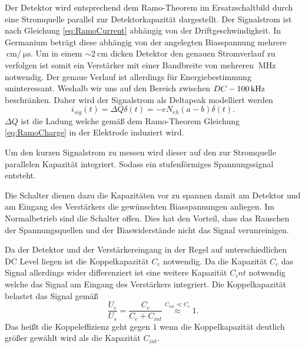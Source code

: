 Der Detektor wird entsprechend dem Ramo-Theorem im Ersatzschaltbild durch eine Stromquelle parallel zur Detektorkapazität dargestellt.
Der Signalstrom ist nach Gleichung \eqref{eq:RamoCurrent} abhängig von der Driftgeschwindigkeit.
In Germanium beträgt diese abhängig von der angelegten Biasspannung mehrere $\SI{}{\centi\meter}/\SI{}{\micro\second}$\cite{Jacoboni1981}.
Um in einem $\sim\SI{2}{\centi\meter}$ dicken Detektor den genauen Stromverlauf zu verfolgen ist somit ein Verstärker mit einer Bandbreite von mehreren $\SI{}{\mega\hertz}$ notwendig.
Der genaue Verlauf ist allerdings für Energiebestimmung uninteressant.
Weshalb wir uns auf den Bereich zwischen $DC\--\SI{100}{\kilo\hertz}$ beschränken.
Daher wird der Signalstrom als Deltapeak modelliert werden
\begin{equation}
i_{sig}(t) = \Delta Q \delta(t) = -eN_{eh}(a-b)\delta(t).
\end{equation}
$\Delta Q$ ist die Ladung welche gemäß dem Ramo-Theorem Gleichung \eqref{eq:RamoCharge} in der Elektrode induziert wird.

Um den kurzen Signalstrom zu messen wird dieser auf den zur Stromquelle parallelen Kapazität integriert.
Sodass ein stufenförmiges Spannungssignal entsteht.

Die Schalter dienen dazu die Kapazitäten vor zu spannen damit am Detektor und am Eingang des Verstärkers die gewünschten Biasspannungen anliegen.
Im Normalbetrieb sind die Schalter offen.
Dies hat den Vorteil, dass das Rauschen der Spannungsquellen und der Biaswiderstände nicht das Signal verunreinigen.

Da der Detektor und der Verstärkereingang in der Regel auf unterschiedlichen DC Level liegen ist die Koppelkapazität $C_c$ notwendig.
Da die Kapazität $C_c$ das Signal allerdings wider differenziert ist eine weitere Kapazität $C_int$ notwendig welche das Signal am Eingang des Verstärkers integriert.
Die Koppelkapazität belastet das Signal gemäß
\begin{equation}
\frac{U_e}{U_s} = \frac{C_c}{C_c + C_{int}} \stackrel{C_{int} \ll C_c}{\approx} 1.
\end{equation}
Das heißt die Koppeleffizienz geht gegen $1$ wenn die Koppelkapazität deutlich größer gewählt wird als die Kapazität $C_{int}$.

